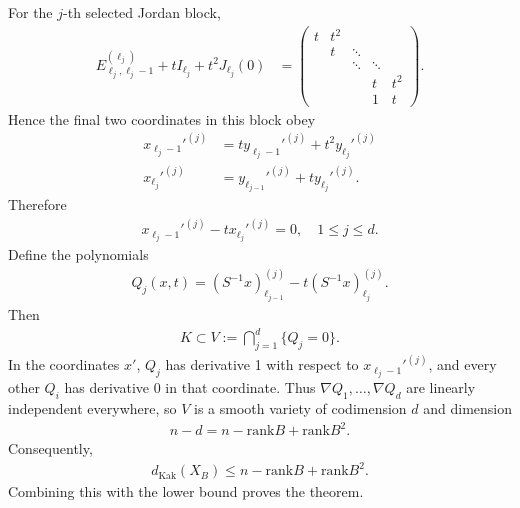\documentclass[reqno,11pt]{amsart}
\numberwithin{equation}{section}
\numberwithin{figure}{section}
\renewcommand\leq{\leqslant}
\theoremstyle{plain}
\theoremstyle{definition}
\newcommand{\rank}{\mathrm{rank}}
\newcommand{\Kak}{\mathrm{Kak}}
\begin{document}
    For the $j$-th selected Jordan block, 
    \begin{align}
            E_{\ell_j, \ell_{j}-1}^{(\ell_j)} + tI_{\ell_j} + t^2 J_{\ell_j}(0) &= 
            \begin{pmatrix}
                t & t^2 &        &        &        \\
                & t   & \ddots &        &        \\
                &     & \ddots & \ddots &        \\
                &     &        & t      & t^2    \\
                &     &        & 1      & t
            \end{pmatrix}.
        \end{align}
    Hence the final two coordinates in this block obey
    \begin{align}
            x_{\ell_j - 1}'^{(j)} &= ty_{\ell_{j}-1}'^{(j)} + t^2 y_{\ell_j}'^{(j)} \\
            x_{\ell_j}'^{(j)} &= y_{\ell_{j-1}}'^{(j)} + t y_{\ell_j}'^{(j)}.
        \end{align}
    Therefore 
    \begin{align}
        x_{\ell_j-1}'^{(j)} - t x_{\ell_j}'^{(j)} = 0, \quad 1 \leq j \leq d.
    \end{align}
    Define the polynomials 
    \begin{align}
        Q_j(x,t) = (S^{-1} x)_{\ell_{j-1}}^{(j)} - t(S^{-1}x)_{\ell_j}^{(j)}.
    \end{align}
    Then 
    \begin{align}
        K \subset V :=\bigcap_{j=1}^d \{Q_j = 0\}.
    \end{align}
    In the coordinates $x'$, $Q_j$ has derivative 1 with respect to $x_{\ell_j-1}'^{(j)}$, and every other $Q_i$ has derivative $0$ in that coordinate. Thus 
    $\nabla Q_1,\ldots, \nabla Q_d$ are linearly independent everywhere, so $V$ is a smooth variety of codimension $d$ and dimension 
    \begin{align}
        n-d = n - \rank B + \rank B^2.
    \end{align}
    Consequently,
    \begin{align}
        d_{\Kak}(X_B) \leq n - \rank B + \rank B^2.
    \end{align}
    Combining this with the lower bound proves the theorem.





	
\end{document}
